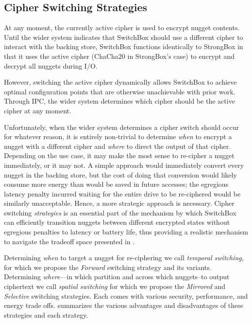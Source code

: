 \subsection{Cipher Switching Strategies}

At any moment, the currently active cipher is used to encrypt nugget contents.
Until the wider system indicates that SwitchBox should use a different cipher to
interact with the backing store, SwitchBox functions identically to StrongBox in
that it uses the active cipher (ChaCha20 in StrongBox's case) to encrypt and
decrypt all nuggets during I/O.

However, switching the active cipher dynamically allows SwitchBox to achieve
optimal configuration points that are otherwise unachievable with prior work.
Through IPC, the wider system determines which cipher should be the active
cipher at any moment.

Unfortunately, when the wider system determines a cipher switch should occur for
whatever reason, it is entirely non-trivial to determine \emph{when} to encrypt
a nugget with a different cipher and \emph{where} to direct the output of that
cipher. Depending on the use case, it may make the most sense to re-cipher a
nugget immediately, or it may not. A simple approach would immediately convert every
nugget in the backing store, but the cost of doing that conversion would likely
consume more energy than would be saved in future accesses; the egregious
latency penalty incurred waiting for the entire drive to be re-ciphered would be
similarly unacceptable. Hence, a more strategic approach is necessary. Cipher
switching \emph{strategies} is an essential part of the mechanism by which
SwitchBox can efficiently transition nuggets between different encrypted states
without egregious penalties to latency or battery life, thus providing a
realistic mechanism to navigate the tradeoff space presented in
.

Determining \emph{when} to target a nugget for re-ciphering we call
\emph{temporal switching}, for which we propose the \emph{Forward} switching
strategy and its variants. Determining \emph{where}---in which partition and
across which nuggets--to output ciphertext we call \emph{spatial switching} for
which we propose the \emph{Mirrored} and \emph{Selective} switching strategies.
Each comes with various security, performance, and energy trade offs.
 summarizes the various advantages and
disadvantages of these strategies and each strategy.

